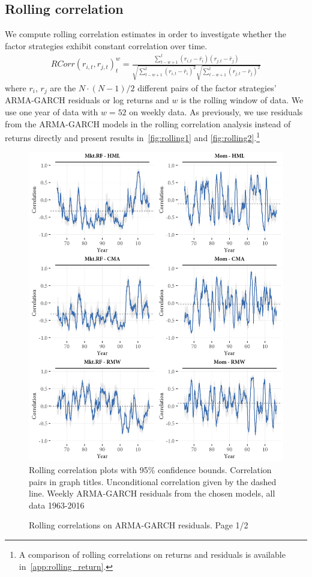 \subsection{Rolling correlation}
\label{subsec:roll_corr}
We compute rolling correlation estimates in order to investigate whether the factor strategies exhibit constant correlation over time. 
\begin{align}
    RCorr(r_{i, t}, r_{j, t})_t^{w} = \frac{\sum^{t}_{t-w+1}(r_{i, t} - \bar{r}_i)(r_{j,t} - \bar{r}_j)}{\sqrt{\sum^{t}_{t-w+1} (r_{i,t} - \bar{r}_i)^2} \sqrt{\sum^{t}_{t-w+1} (r_{j,t} - \bar{r}_j)^2}}
\end{align}
where $r_i$, $r_j$ are the $N \cdot (N-1) / 2$ different pairs of the factor strategies' ARMA-GARCH residuals or log returns and $w$ is the rolling window of data. We use one year of data with $w = 52$ on weekly data. As previously, we use residuals from the ARMA-GARCH models in the rolling correlation analysis instead of returns directly and present results in~\autoref{fig:rolling1} and \autoref{fig:rolling2}.\footnote{A comparison of rolling correlations on returns and residuals is available in~\autoref{app:rolling_return}.}
\begin{figure}[H]
  \caption{Rolling correlations on ARMA-GARCH residuals. Page 1/2}
  \label{fig:rolling1}
  \centering
  \begin{minipage}{\textwidth}
  \includegraphics[scale=1]{graphics/rolling1.png}  
  \vspace{3mm}
  \footnotesize
  Rolling correlation plots with 95\% confidence bounds. Correlation pairs in graph titles. Unconditional correlation given by the dashed line. Weekly ARMA-GARCH residuals from the chosen models, all data 1963-2016
  \end{minipage}
\end{figure}
